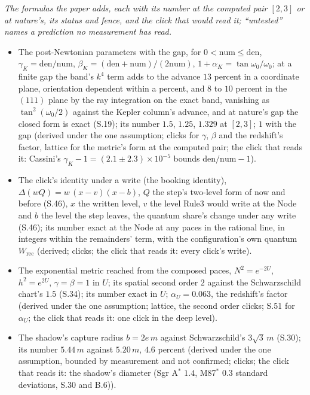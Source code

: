 \documentclass[pdflatex,sn-mathphys-num]{sn-jnl}
\newcommand{\num}{\mathrm{num}}
\newcommand{\den}{\mathrm{den}}
\theoremstyle{thmstyleone}
\theoremstyle{thmstyletwo}
\begin{document}
\noindent\emph{The formulas the paper adds, each with its number at the computed pair $[2, 3]$ or at nature's, its status and fence, and the click that would read it; ``untested'' names a prediction no measurement has read.}
\begin{itemize}[nosep,leftmargin=1.2em]
\item The post-Newtonian parameters with the gap, for $0 < \num \le \den$, $\gamma_K = \den / \num$, $\beta_K = (\den + \num) / (2\num)$, $1 + \alpha_K = \tan\omega_0 / \omega_0$; at a finite gap the band's $k^4$ term adds to the advance $13$ percent in a coordinate plane, orientation dependent within a percent, and $8$ to $10$ percent in the $(111)$ plane by the ray integration on the exact band, vanishing as $\tan^2(\omega_0 / 2)$ against the Kepler column's advance, and at nature's gap the closed form is exact (S.19); its number $1.5$, $1.25$, $1.329$ at $[2, 3]$; $1$ with the gap (derived under the one assumption; clicks for $\gamma$, $\beta$ and the redshift's factor, lattice for the metric's form at the computed pair; the click that reads it: Cassini's $\gamma_K - 1 = (2.1 \pm 2.3) \times 10^{-5}$ bounds $\den / \num - 1$).
\item The click's identity under a write (the booking identity), $\Delta(wQ) = w\,(x - v)(x - b)$, $Q$ the step's two-level form of now and before (S.46), $x$ the written level, $v$ the level Rule3 would write at the Node and $b$ the level the step leaves, the quantum share's change under any write (S.46); its number exact at the Node at any paces in the rational line, in integers within the remainders' term, with the configuration's own quantum $W_{\mathrm{rec}}$ (derived; clicks; the click that reads it: every click's write).
\item The exponential metric reached from the composed paces, $N^2 = e^{-2U}$, $h^2 = e^{2U}$, $\gamma = \beta = 1$ in $U$; its spatial second order $2$ against the Schwarzschild chart's $1.5$ (S.34); its number exact in $U$; $\alpha_U = 0.063$, the redshift's factor (derived under the one assumption; lattice, the second order clicks; S.51 for $\alpha_U$; the click that reads it: one click in the deep level).
\item The shadow's capture radius $b = 2e\,m$ against Schwarzschild's $3\sqrt 3\,m$ (S.30); its number $5.44\,m$ against $5.20\,m$, $4.6$ percent (derived under the one assumption, bounded by measurement and not confirmed; clicks; the click that reads it: the shadow's diameter (Sgr A$^*$ $1.4$, M87$^*$ $0.3$ standard deviations, S.30 and B.6)).

\end{itemize}
\end{document}
